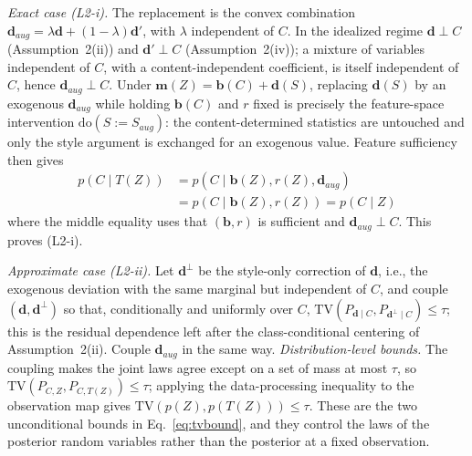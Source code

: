\documentclass[electronics,article,submit,moreauthors]{Definitions/mdpi}
\newcommand{\add}[1]{\textcolor{addblue}{#1}}
\newcommand{\del}[1]{\textcolor{delred}{\st{#1}}}
\def\add#1{#1}
\def\del#1{}
\begin{document}
\emph{Exact case (L2-i).} The replacement is the convex combination $\mathbf{d}_{aug}=\lambda\mathbf{d}+(1-\lambda)\mathbf{d}'$, with $\lambda$ independent of $C$. In the idealized regime $\mathbf{d}\perp C$ (Assumption~2(ii)) and $\mathbf{d}'\perp C$ (Assumption~2(iv)); a mixture of variables independent of $C$, with a content-independent coefficient, is itself independent of $C$, hence $\mathbf{d}_{aug}\perp C$. Under $\mathbf{m}(Z)=\mathbf{b}(C)+\mathbf{d}(S)$, replacing $\mathbf{d}(S)$ by an exogenous $\mathbf{d}_{aug}$ while holding $\mathbf{b}(C)$ and $r$ fixed is precisely the feature-space intervention $\mathrm{do}(S\!:=\!S_{aug})$: the content-determined statistics are untouched and only the style argument is exchanged for an exogenous value. Feature sufficiency then gives
\begin{equation*}
\begin{aligned}
p(C\mid T(Z))&=p\!\left(C\mid \mathbf{b}(Z),r(Z),\mathbf{d}_{aug}\right)\\
&=p\!\left(C\mid \mathbf{b}(Z),r(Z)\right)=p(C\mid Z)
\end{aligned}
\end{equation*}
where the middle equality uses that $(\mathbf{b},r)$ is sufficient and $\mathbf{d}_{aug}\perp C$. This proves (L2-i).

\emph{Approximate case (L2-ii).} Let $\mathbf{d}^{\perp}$ be the style-only correction of $\mathbf{d}$, i.e., the exogenous deviation with the same marginal but independent of $C$, and couple $(\mathbf{d},\mathbf{d}^{\perp})$ so that, conditionally and uniformly over $C$, $\mathrm{TV}(P_{\mathbf{d}\mid C},P_{\mathbf{d}^{\perp}\mid C})\le\tau$; this is \del{precisely }the residual dependence left after the class-conditional centering of Assumption~2(ii). Couple $\mathbf{d}_{aug}$ in the same way. \del{Since the posterior \mbox{$q(c)=p(c\mid \mathbf{b},r,\mathbf{d})$} is a measurable function of the observed statistics, the data-processing inequality for total variation transports the coupling discrepancy to the posterior without amplification:}
\add{\emph{Distribution-level bounds.} The coupling makes the joint laws agree except on a set of mass at most $\tau$, so $\mathrm{TV}(P_{C,Z},P_{C,T(Z)})\le\tau$; applying the data-processing inequality to the observation map gives $\mathrm{TV}(p(Z),p(T(Z)))\le\tau$. These are the two unconditional bounds in Eq.~\eqref{eq:tvbound}, and they control the laws of the posterior random variables rather than the posterior at a fixed observation.}
\end{document}
